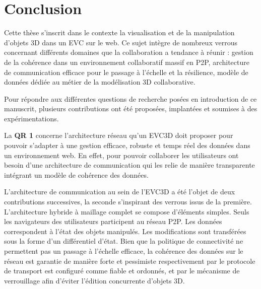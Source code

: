 \chapter{Conclusion}
\chaptertable

Cette thèse s'inscrit dans le contexte la visualisation et de la manipulation d'objets 
3D dans un \gls{EVC} sur le web. Ce sujet intègre de nombreux verrous 
concernant différents domaines que la collaboration a tendance à réunir : gestion 
de la cohérence dans un environnement collaboratif massif en \gls{P2P}, 
architecture de communication efficace pour le passage à l'échelle et la résilience, 
modèle de données dédiée au métier de la modélisation 3D collaborative. 

Pour répondre aux différentes questions de 
recherche posées en introduction de ce manuscrit, plusieurs contributions ont été 
proposées, implantées et soumises à des expérimentations. 

La \textbf{QR 1} concerne l'architecture réseau qu'un \gls{EVC3D} doit proposer 
pour 
pouvoir s'adapter à une gestion efficace, robuste et temps réel des données dans 
un environnement web. En effet, pour pouvoir collaborer les utilisateurs ont besoin 
d'une architecture de communication qui les relie de manière transparente 
intégrant un modèle de cohérence des données. 

L'architecture de communication au sein de l'\gls{EVC3D} a été l'objet de deux 
contributions successives, la seconde s'inspirant des verrous issus de la 
première. 
L'architecture hybride à maillage complet se compose d'éléments 
simples. 
Seuls 
les navigateurs des utilisateurs participent au réseau \gls{P2P}. Les données 
correspondent à l'état des objets manipulés. Les modifications sont transférées 
sous la forme d'un différentiel d'état. Bien que la politique de connectivité ne 
permettent pas un passage à l'échelle efficace, la cohérence des données sur le 
réseau est garantie de manière forte et pessimiste respectivement par le protocole 
de transport est configuré comme fiable et ordonnés, et par le mécanisme de 
verrouillage afin d'éviter l'édition concurrente d'objets 3D.

